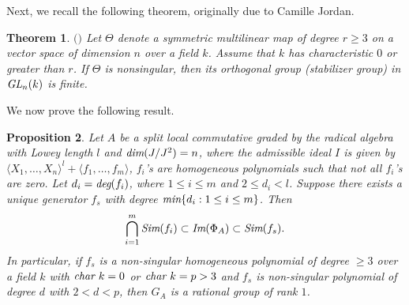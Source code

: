 \documentclass[12pt]{amsart}
\newtheorem{theorem}{Theorem}[section]
\newtheorem{proposition}[theorem]{Proposition}
\theoremstyle{definition}
\numberwithin{equation}{section}
\begin{document}
\vspace{0.1in}
\noindent
Next, we recall the following theorem, originally due to Camille Jordan.
\begin{theorem}\label{Theorem 5.31}
$($\cite{Schneider}$)$ Let $\Theta$ denote a symmetric multilinear map of degree $r\geq 3$ on a vector space of dimension $n$ over a field $k$. Assume that $k$ has characteristic $0$ or greater than $r$. If $\Theta$ is nonsingular, then its orthogonal group (stabilizer group) in $\emph{GL}_n(k)$ is finite.
\end{theorem}
\vskip2mm
\noindent
We now prove the following result.
\vskip 2mm
\begin{proposition}\label{Proposition 5.32}
Let $A$ be a split local commutative graded by the radical algebra with Lowey length $l$ and $\emph{dim}(J/J^2)=n$, where the admissible ideal $I$ is given by $\langle X_1,\dots,X_n \rangle^l +\langle f_1,\dots,f_m\rangle$, $f_i$'s are homogeneous polynomials such that not all $f_{i}$'s are zero. Let $d_i=\emph{deg}(f_i)$, where $1\leq i\leq m$ and $2\leq d_i<l$.  Suppose there exists a unique generator $f_s$ with degree $\emph{min}\{d_i: 1\leq i\leq m\}$. Then 
\[\bigcap_{i=1}^{m}\emph{Sim}(f_i)\subset\emph{\text{Im}}(\Phi_A)\subset \emph{Sim}(f_s).\]
In particular, if $f_s$ is a non-singular homogeneous polynomial of degree $\geq 3$ over a field $k$ with $\emph{char }k=0$ or $\emph{char }k=p>3$ and $f_s$ is non-singular polynomial of degree $d$ with $2<d<p$, then $G_A$ is a rational group of rank $1$.
\end{proposition}
\vskip1mm
\end{document}
